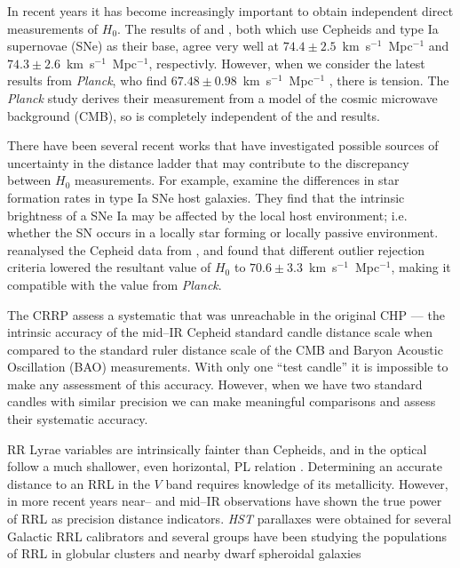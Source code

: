\documentclass[a4paper,fleqn,usenatbib]{mnras}
\newcommand{\ho}{$H_{0}$\xspace}
\begin{document}
In recent years it has become increasingly important to obtain independent direct measurements of \ho. The results of \citet{2011ApJ...730..119R} and \citet{2012ApJ...758...24F}, both which use Cepheids and type Ia supernovae (SNe) as their base, agree very well at $74.4\pm 2.5$~km~s$^{-1}$~Mpc$^{-1}$ and $74.3\pm2.6$~km~s$^{-1}$~Mpc$^{-1}$, respectivly. However, when we consider the latest results from {\it Planck}, who find $67.48\pm0.98$~km~s$^{-1}$~Mpc$^{-1}$ \citep{2015arXiv150201589P}, there is tension. The {\it Planck} study derives their measurement from a model of the cosmic microwave background (CMB), so is completely independent of the \citeauthor{2011ApJ...730..119R} and \citeauthor{2012ApJ...758...24F} results. 

There have been several recent works that have investigated possible sources of uncertainty in the distance ladder that may contribute to the discrepancy between \ho measurements. For example, \citet{2015ApJ...802...20R} examine the differences in star formation rates in type Ia SNe host galaxies. They find that the intrinsic brightness of a SNe Ia may be affected by the local host environment; i.e. whether the SN occurs in a locally star forming or locally passive environment. \citet{2014MNRAS.440.1138E} reanalysed the Cepheid data from \citet{2011ApJ...730..119R}, and found that different outlier rejection criteria lowered the resultant value of \ho to $70.6 \pm 3.3$~km~s$^{-1}$~Mpc$^{-1}$, making it compatible with the value from {\it Planck}. 

The CRRP assess a systematic that was unreachable in the original CHP --- the intrinsic accuracy of the mid--IR Cepheid standard candle distance scale when compared to the standard ruler distance scale of the CMB and Baryon Acoustic Oscillation (BAO) measurements. With only one ``test candle'' it is impossible to make any assessment of this accuracy. However, when we have two standard candles with similar precision we can make meaningful comparisons and assess their systematic accuracy.

RR Lyrae variables are intrinsically fainter than Cepheids, and in the optical follow a much shallower, even horizontal, PL relation \citep{2004ApJS..154..633C}. Determining an accurate distance to an RRL in the $V$ band requires knowledge of its metallicity. However, in more recent years near-- and mid--IR observations have shown the true power of RRL as precision distance indicators. \textit{HST} parallaxes were obtained for several Galactic RRL calibrators \citep{2011AJ....142..187B} and several groups have been studying the populations of RRL in globular clusters and nearby dwarf spheroidal galaxies \citep[e.g.][and references therein]{2013ApJ...767...62G, 2014ApJ...786..147O, 2015ApJ...806..200C, 2015A&A...578A.128K}
\end{document}
